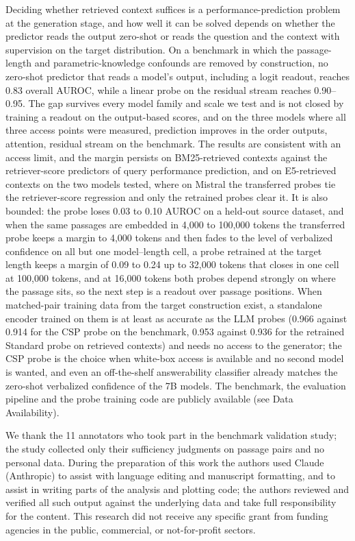 \documentclass[acmsmall,screen,review]{acmart}
\begin{document}
Deciding whether retrieved context suffices is a performance-prediction problem at the generation stage, and how well it can be solved depends on whether the predictor reads the output zero-shot or reads the question and the context with supervision on the target distribution. On a benchmark in which the passage-length and parametric-knowledge confounds are removed by construction, no zero-shot predictor that reads a model's output, including a logit readout, reaches 0.83 overall AUROC, while a linear probe on the residual stream reaches 0.90--0.95. The gap survives every model family and scale we test and is not closed by training a readout on the output-based scores, and on the three models where all three access points were measured, prediction improves in the order outputs, attention, residual stream on the benchmark. The results are consistent with an access limit, and the margin persists on BM25-retrieved contexts against the retriever-score predictors of query performance prediction, and on E5-retrieved contexts on the two models tested, where on Mistral the transferred probes tie the retriever-score regression and only the retrained probes clear it. It is also bounded: the probe loses 0.03 to 0.10 AUROC on a held-out source dataset, and when the same passages are embedded in 4,000 to 100,000 tokens the transferred probe keeps a margin to 4,000 tokens and then fades to the level of verbalized confidence on all but one model--length cell, a probe retrained at the target length keeps a margin of 0.09 to 0.24 up to 32,000 tokens that closes in one cell at 100,000 tokens, and at 16,000 tokens both probes depend strongly on where the passage sits, so the next step is a readout over passage positions. When matched-pair training data from the target construction exist, a standalone encoder trained on them is at least as accurate as the LLM probes (0.966 against 0.914 for the CSP probe on the benchmark, 0.953 against 0.936 for the retrained Standard probe on retrieved contexts) and needs no access to the generator; the CSP probe is the choice when white-box access is available and no second model is wanted, and even an off-the-shelf answerability classifier already matches the zero-shot verbalized confidence of the 7B models. The benchmark, the evaluation pipeline and the probe training code are publicly available (see Data Availability).

\begin{acks}
We thank the 11 annotators who took part in the benchmark validation study; the study collected only their sufficiency judgments on passage pairs and no personal data. During the preparation of this work the authors used Claude (Anthropic) to assist with language editing and manuscript formatting, and to assist in writing parts of the analysis and plotting code; the authors reviewed and verified all such output against the underlying data and take full responsibility for the content. This research did not receive any specific grant from funding agencies in the public, commercial, or not-for-profit sectors.
\end{acks}
\end{document}

